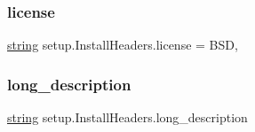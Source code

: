 \subsubsection{\texorpdfstring{license}{license}}
{\footnotesize\ttfamily \mbox{\hyperlink{asdl_8h_ae84541b4f3d8e1ea24ec0f466a8c568b}{string}} setup.\+Install\+Headers.\+license = \textquotesingle{}B\+SD\textquotesingle{},\hspace{0.3cm}{\ttfamily [static]}}

\mbox{\label{classsetup_1_1_install_headers_a8d17c057e121f10b6c6fcad35aa482e4}} 
\subsubsection{\texorpdfstring{long\_description}{long\_description}}
{\footnotesize\ttfamily \mbox{\hyperlink{asdl_8h_ae84541b4f3d8e1ea24ec0f466a8c568b}{string}} setup.\+Install\+Headers.\+long\+\_\+description\hspace{0.3cm}{\ttfamily [static]}}

